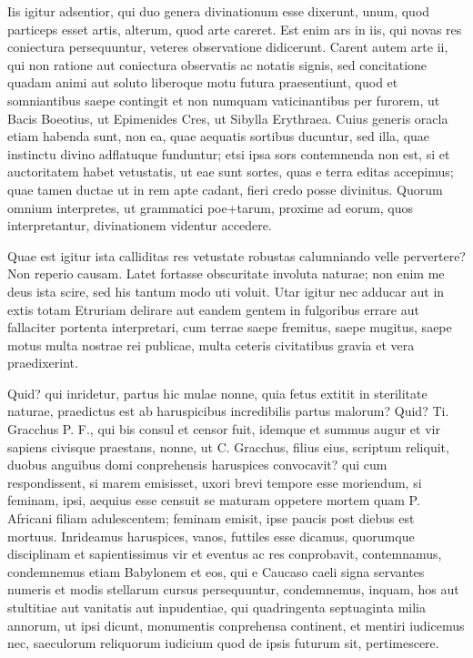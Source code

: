  Iis igitur adsentior, qui duo genera divinationum esse dixerunt, unum, quod particeps esset artis, alterum, quod arte careret. Est enim ars in iis, qui novas res coniectura persequuntur, veteres observatione didicerunt. Carent autem arte ii, qui non ratione aut coniectura observatis ac notatis signis, sed concitatione quadam animi aut soluto liberoque motu futura praesentiunt, quod et somniantibus saepe contingit et non numquam vaticinantibus per furorem, ut Bacis Boeotius, ut Epimenides Cres, ut Sibylla Erythraea. Cuius generis oracla etiam habenda sunt, non ea, quae aequatis sortibus ducuntur, sed illa, quae instinctu divino adflatuque funduntur; etsi ipsa sors contemnenda non est, si et auctoritatem habet vetustatis, ut eae sunt sortes, quas e terra editas accepimus; quae tamen ductae ut in rem apte cadant, fieri credo posse divinitus. Quorum omnium interpretes, ut grammatici poe+tarum, proxime ad eorum, quos interpretantur, divinationem videntur accedere.

 Quae est igitur ista calliditas res vetustate robustas calumniando velle pervertere? Non reperio causam. Latet fortasse obscuritate involuta naturae; non enim me deus ista scire, sed his tantum modo uti voluit. Utar igitur nec adducar aut in extis totam Etruriam delirare aut eandem gentem in fulgoribus errare aut fallaciter portenta interpretari, cum terrae saepe fremitus, saepe mugitus, saepe motus multa nostrae rei publicae, multa ceteris civitatibus gravia et vera praedixerint.

 Quid? qui inridetur, partus hic mulae nonne, quia fetus extitit in sterilitate naturae, praedictus est ab haruspicibus incredibilis partus malorum? Quid? Ti. Gracchus P. F., qui bis consul et censor fuit, idemque et summus augur et vir sapiens civisque praestans, nonne, ut C. Gracchus, filius eius, scriptum reliquit, duobus anguibus domi conprehensis haruspices convocavit? qui cum respondissent, si marem emisisset, uxori brevi tempore esse moriendum, si feminam, ipsi, aequius esse censuit se maturam oppetere mortem quam P. Africani filiam adulescentem; feminam emisit, ipse paucis post diebus est mortuus. Inrideamus haruspices, vanos, futtiles esse dicamus, quorumque disciplinam et sapientissimus vir et eventus ac res conprobavit, contemnamus, condemnemus etiam Babylonem et eos, qui e Caucaso caeli signa servantes numeris et modis stellarum cursus persequuntur, condemnemus, inquam, hos aut stultitiae aut vanitatis aut inpudentiae, qui quadringenta septuaginta milia annorum, ut ipsi dicunt, monumentis conprehensa continent, et mentiri iudicemus nec, saeculorum reliquorum iudicium quod de ipsis futurum sit, pertimescere.

